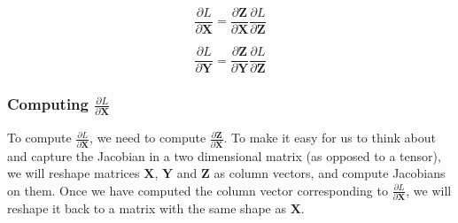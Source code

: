 \documentclass{article}
\newcommand{\matr}[1]{\mathbf{#1}} %
\begin{document}
\begin{equation} \label{dX_matrix_addition}
\frac{\partial L}{\partial \matr{X}} = \frac{\partial \matr{Z}}{\partial \matr{X}}\frac{\partial L}{\partial \matr{Z}}
\end{equation}

\begin{equation} \label{dY_matrix_addition}
\frac{\partial L}{\partial \matr{Y}} = \frac{\partial \matr{Z}}{\partial \matr{Y}}\frac{\partial L}{\partial \matr{Z}}
\end{equation}

\subsubsection{Computing $\frac{\partial L}{\partial \matr{X}}$}
To compute $\frac{\partial L}{\partial \matr{X}}$, we need to compute $\frac{\partial \matr{Z}}{\partial \matr{X}}$. To make it easy for us to think about and capture the Jacobian in a two dimensional matrix (as opposed to a tensor), we will reshape matrices $\matr{X}$, $\matr{Y}$ and $\matr{Z}$ as column vectors, and compute Jacobians on them. Once we have computed the column vector corresponding to $\frac{\partial L}{\partial \matr{X}}$, we will reshape it back to a matrix with the same shape as $\matr{X}$.
\end{document}

